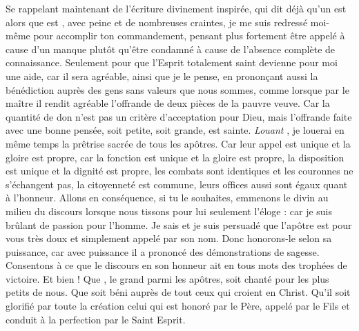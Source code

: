 \pend

\pstart

Se rappelant maintenant de l'écriture divinement inspirée, qui dit déjà qu'un  est 
alors que  est ,  
avec peine et de nombreuses craintes, je me suis redressé moi-même pour accomplir  ton commandement, 
pensant plus fortement être appelé à cause d'un manque  plutôt qu'être condamné à cause de l'absence complète de connaissance. 
Seulement  %
pour que l'Esprit totalement saint devienne pour moi une aide, 
car il  sera agréable, ainsi que je le pense, 
en prononçant aussi la bénédiction auprès des gens sans valeurs que nous sommes,
comme lorsque par le maître il rendit agréable  l'offrande  de deux pièces de la pauvre veuve.
Car la quantité de don n'est pas un critère d'acceptation pour Dieu, %
mais  l'offrande faite avec une bonne pensée, soit petite,  soit grande, est sainte.
\pend
\pstart
\emph{Louant} , je louerai en même temps la prêtrise sacrée %
de tous les apôtres.
Car leur appel est unique et la gloire est propre, %
car la fonction est unique et la gloire est propre,
la disposition est unique et la dignité est propre,
les combats sont identiques et les couronnes ne s'échangent pas,
la citoyenneté est commune, 
leurs offices aussi sont égaux quant à l'honneur.
Allons en conséquence, si tu le souhaites, 
emmenons le divin  au milieu du discours
lorsque  nous tissons pour lui seulement l'éloge :  car je suis brûlant de passion pour l'homme.
Je sais et je suis persuadé que  l'apôtre est pour vous très doux et simplement appelé par son nom.
Donc honorons-le  selon sa puissance, car avec puissance il a prononcé des démonstrations de sagesse.
Consentons à ce que le discours en son honneur ait en tous mots des trophées de victoire.
\pend
\pstart
\saut 
Et bien ! Que , le grand parmi les apôtres, soit chanté pour les plus petits de nous.
Que soit béni  auprès de tout ceux qui croient en Christ.
Qu'il soit glorifié par toute la création celui qui est honoré par le Père, appelé par le Fils et conduit à la perfection par le Saint Esprit. 
